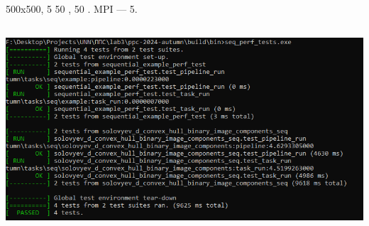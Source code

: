 \documentclass[a4paper]{article}
\begin{document}
\section{{\CYREREV}{\cyrk}{\cyrs}{\cyrp}{\cyre}{\cyrr}{\cyri}{\cyrm}{\cyre}{\cyrn}{\cyrt}{\cyra}{\cyrl}{\cyrsftsn}{\cyrn}{\cyra}{\cyrya}
{\cyrp}{\cyrr}{\cyro}{\cyrv}{\cyre}{\cyrr}{\cyrk}{\cyra}
{\cyra}{\cyrl}{\cyrg}{\cyro}{\cyrr}{\cyri}{\cyrt}{\cyrm}{\cyra}}
{
{\CYRD}{\cyrl}{\cyrya} {\cyrp}{\cyrr}{\cyro}{\cyrv}{\cyre}{\cyrr}{\cyrk}{\cyri}
{\cyra}{\cyrl}{\cyrg}{\cyro}{\cyrr}{\cyri}{\cyrt}{\cyrm}{\cyra} {\cyrb}{\cyrery}{\cyrl}{\cyro}
{\cyrv}{\cyrery}{\cyrb}{\cyrr}{\cyra}{\cyrn}{\cyro}
{\cyri}{\cyrz}{\cyro}{\cyrb}{\cyrr}{\cyra}{\cyrzh}{\cyre}{\cyrn}{\cyri}{\cyrya} \foreignlanguage{english}{500x500,
}\foreignlanguage{russian}{{\cyrs}{\cyro}{\cyrd}{\cyre}{\cyrr}{\cyrzh}{\cyra}{\cyrshch}{\cyre}{\cyre} 5
{\cyrk}{\cyro}{\cyrm}{\cyrp}{\cyro}{\cyrn}{\cyre}{\cyrn}{\cyrt}
{\cyro}{\cyrd}{\cyri}{\cyrn}{\cyra}{\cyrk}{\cyro}{\cyrv}{\cyro}{\cyrg}{\cyro}
{\cyrr}{\cyra}{\cyrz}{\cyrm}{\cyre}{\cyrr}{\cyra} 50 {\cyrp}{\cyri}{\cyrk}{\cyrs}{\cyre}{\cyrl}{\cyre}{\cyrishrt},
{\cyrr}{\cyra}{\cyrz}{\cyrd}{\cyre}{\cyrl}{\cyre}{\cyrn}{\cyrn}{\cyrery}{\cyre}
{\cyrp}{\cyrr}{\cyro}{\cyrb}{\cyre}{\cyrl}{\cyra}{\cyrm}{\cyri} {\cyrv} 50
{\cyrp}{\cyri}{\cyrk}{\cyrs}{\cyre}{\cyrl}{\cyre}{\cyrishrt}.
{\CYRK}{\cyro}{\cyrl}{\cyri}{\cyrch}{\cyre}{\cyrs}{\cyrt}{\cyrv}{\cyro}
{\cyrp}{\cyrr}{\cyro}{\cyrc}{\cyre}{\cyrs}{\cyrs}{\cyro}{\cyrv} {\cyrd}{\cyrl}{\cyrya}
{\cyrt}{\cyre}{\cyrs}{\cyrt}{\cyri}{\cyrr}{\cyro}{\cyrv}{\cyra}{\cyrn}{\cyri}{\cyre} }\foreignlanguage{english}{MPI
}\foreignlanguage{russian}{{\cyrv}{\cyre}{\cyrr}{\cyrs}{\cyri}{\cyri} --- 5.}}



\begin{center}
\includegraphics[width=424.26pt,height=216.85pt]{report-img001.png}
\end{center}
\end{document}
